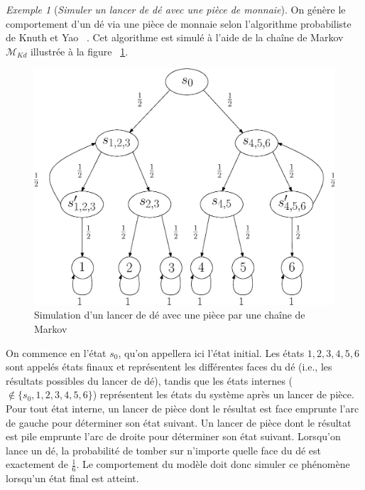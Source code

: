 \documentclass[12pt,a4paper]{report}
\theoremstyle{definition}%
\theoremstyle{remark}
\newtheorem{example}{Exemple}[chapter]
\newcommand{\ie}{i.e., }
\begin{document}
\begin{example} [\textit{Simuler un lancer de dé avec une pièce de monnaie}] \label{knuthdie}
	On génère le comportement d'un dé via une pièce de monnaie selon l'algorithme probabiliste de Knuth et Yao ~\cite{KY76}. Cet algorithme est simulé à l'aide de la chaîne de Markov $\mathcal{M}_{Kd}$ illustrée à la figure ~\ref{diebyacoin}.
	\begin{figure}[H]
		\centering
		\includegraphics[scale=0.5]{figures/dieByaCoin.eps}
		\caption{Simulation d'un lancer de dé avec une pièce par une chaîne de Markov}
		\label{diebyacoin}
	\end{figure}
	On commence en l'état $s_0$, qu'on appellera ici l'état initial. Les états $1, 2, 3, 4, 5, 6$ sont appelés états finaux et représentent les différentes faces du dé (\ie les résultats possibles du lancer de dé), tandis que les états internes ($\notin \{s_0, 1, 2, 3, 4, 5, 6\}$) représentent les états du système après un lancer de pièce.
	 Pour tout état interne, un lancer de pièce dont le résultat est face emprunte l'arc de gauche pour déterminer son état suivant. Un lancer de pièce dont le résultat est pile emprunte l'arc de droite pour déterminer son état suivant. Lorsqu'on lance un dé, la probabilité de tomber sur n'importe quelle face du dé est exactement de $\frac{1}{6}$. Le comportement du modèle doit donc simuler ce phénomène lorsqu'un état final est atteint.\\


\end{example}
\end{document}
